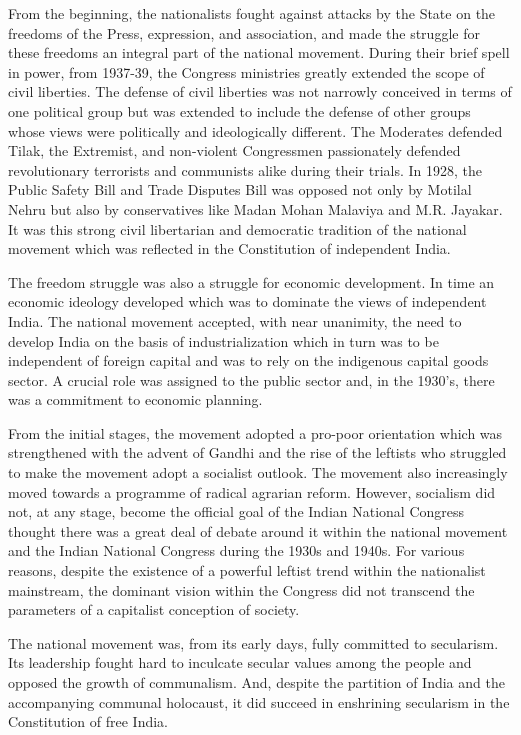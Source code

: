 From the beginning, the nationalists fought against attacks by the State on the freedoms of the Press, expression, and association, and made the struggle for these freedoms an integral part of the national movement. During their brief spell in power, from 1937-39, the Congress ministries greatly extended the scope of civil liberties. The defense of civil liberties was not narrowly conceived in terms of one political group but was extended to include the defense of other groups whose views were politically and ideologically different. The Moderates defended Tilak, the Extremist, and non-violent Congressmen passionately defended revolutionary terrorists and communists alike during their trials. In 1928, the Public Safety Bill and Trade Disputes Bill was opposed not only by Motilal Nehru but also by conservatives like Madan Mohan Malaviya and M.R. Jayakar. It was this strong civil libertarian and democratic tradition of the national movement which was reflected in the Constitution of independent India.

The freedom struggle was also a struggle for economic development. In time an economic ideology developed which was to dominate the views of independent India. The national movement accepted, with near unanimity, the need to develop India on the basis of industrialization which in turn was to be independent of foreign capital and was to rely on the indigenous capital goods sector. A crucial role was assigned to the public sector and, in the 1930's, there was a commitment to economic planning.

From the initial stages, the movement adopted a pro-poor orientation which was strengthened with the advent of Gandhi and the rise of the leftists who struggled to make the movement adopt a socialist outlook. The movement also increasingly moved towards a programme of radical agrarian reform. However, socialism did not, at any stage, become the official goal of the Indian National Congress thought there was a great deal of debate around it within the national movement and the Indian National Congress during the 1930s and 1940s. For various reasons, despite the existence of a powerful leftist trend within the nationalist mainstream, the dominant vision within the Congress did not transcend the parameters of a capitalist conception of society.

The national movement was, from its early days, fully committed to secularism. Its leadership fought hard to inculcate secular values among the people and opposed the growth of communalism. And, despite the partition of India and the accompanying communal holocaust, it did succeed in enshrining secularism in the Constitution of free India.

